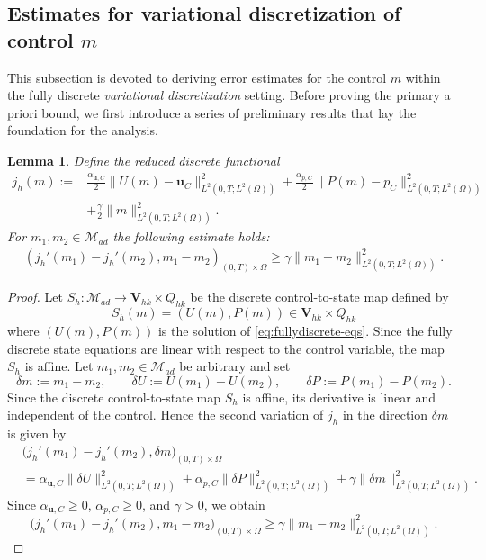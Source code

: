 \documentclass{amsart}
\newtheorem{lemma}[theorem]{Lemma}
\newcommand{\mc}[1]{\mathcal{#1}}
\begin{document}
\subsection{Estimates for variational discretization of control $m$}
This subsection is devoted to deriving error estimates for the control $m$ within the fully discrete \textit{variational discretization} setting. Before proving the primary a priori bound, we first introduce a series of preliminary results that lay the foundation for the analysis.
\begin{lemma}\label{Lemma:5.7}
    Define the reduced discrete functional
\[
\begin{aligned}
        j_h(m)
        :=
        &\frac{\alpha_{\boldsymbol{u},C}}{2}
        \|U(m)-\boldsymbol{u}_C\|_{L^2(0,T; L^2(\Omega))}^{2}
        +
        \frac{\alpha_{p,C}}{2}
        \|P(m)-p_C\|_{L^2(0,T; L^2(\Omega))}^{2}  
        \\
        &+
        \frac{\gamma}{2}
        \|m\|_{L^2(0,T; L^2(\Omega))}^{2} .
\end{aligned}
\]
    For $m_1, m_2 \in \mc{M}_{ad}$ the following estimate holds:
	\begin{align}
		\left(j_{h}'(m_1) - j_{h}'(m_2),m_1-m_2\right)_{(0,T)\times \Omega} \ge \gamma  \|m_1-m_2\|_{L^2(0,T; L^2(\Omega))}^2.
	\end{align}
\end{lemma}
\begin{proof}
Let $S_h:\mathcal{M}_{ad}\to \boldsymbol{V}_{hk}\times Q_{hk}$ be the discrete control-to-state map defined by
\[
        S_h(m)=(U(m),P(m)) \in \boldsymbol{V}_{hk} \times Q_{hk}
\]
%
where $(U(m), P(m))$ is the solution of \eqref{eq:fullydiscrete-eqs}. Since the fully discrete state equations are linear with respect to the control variable, the map $S_h$ is affine. %
Let $m_1,m_2\in \mathcal{M}_{ad}$ be arbitrary and set
\[
        \delta m := m_1-m_2,\qquad
        \delta U := U(m_1)-U(m_2),\qquad
        \delta P := P(m_1)-P(m_2).
\]
Since the discrete control-to-state map $S_h$ is affine, its derivative is
linear and independent of the control. Hence the second variation of
$j_h$ in the direction $\delta m$ is given by
%
\begin{align*}
&\bigl(j_h'(m_1)-j_h'(m_2),\delta m\bigr)_{(0,T) \times \Omega}
\\
&=
\alpha_{\boldsymbol{u},C}\|\delta U\|_{L^2(0,T;L^2(\Omega))}^{2}
+
\alpha_{p,C}\|\delta P\|_{L^2(0,T;L^2(\Omega))}^{2}
+
\gamma\|\delta m\|_{L^2(0,T;L^2(\Omega))}^{2}.
\end{align*}
%
Since $\alpha_{\boldsymbol{u},C}\ge 0$, $\alpha_{p,C}\ge 0$, and
$\gamma>0$, we obtain
\[
\bigl(j_h'(m_1)-j_h'(m_2),m_1-m_2\bigr)_{(0,T)\times \Omega}
\ge
\gamma
\|m_1-m_2\|_{L^2(0,T;L^2(\Omega))}^{2}.
\]
\end{proof}
\end{document}
